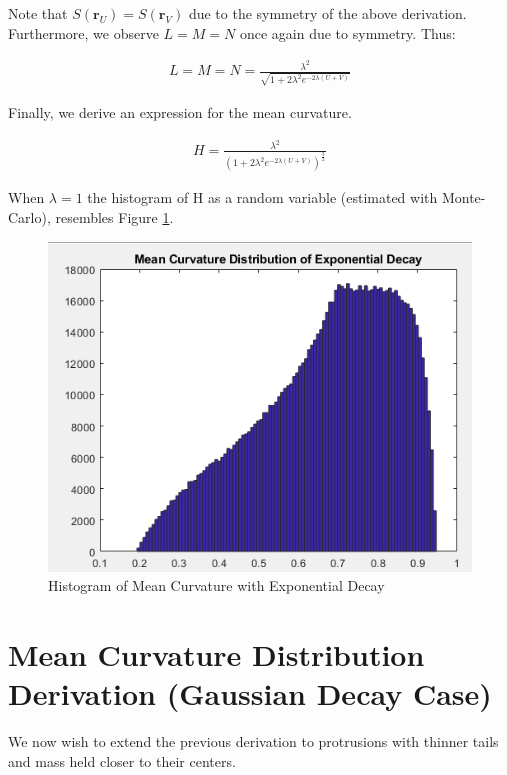 \documentclass[preprint,12pt]{elsarticle}
\begin{document}
Note that $S(\mathbf{r}_U) = S(\mathbf{r}_V)$ due to the symmetry of the above derivation. Furthermore, we observe $L = M = N$ once again due to symmetry. Thus:

\begin{gather}
	L = M = N = \frac{\lambda^{2}}{\sqrt{1 + 2\lambda^{2}e^{-2\lambda(U + V)}}}
\end{gather}

Finally, we derive an expression for the mean curvature.

\begin{gather}
	H = \frac{\lambda^{2}}{(1 + 2\lambda^{2}e^{-2\lambda(U + V)})^{\frac{3}{2}}}
\end{gather}

When $\lambda = 1$ the histogram of H as a random variable (estimated with Monte-Carlo), resembles Figure \ref{fig:exp_decay_distribution}.

\begin{figure}
\includegraphics[width=15cm]{exp_decay_distribution}
\caption{Histogram of Mean Curvature with Exponential Decay}
\label{fig:exp_decay_distribution}
\end{figure}

\section{Mean Curvature Distribution Derivation (Gaussian Decay Case)}

We now wish to extend the previous derivation to protrusions with thinner tails and mass held closer to their centers.
\end{document}

